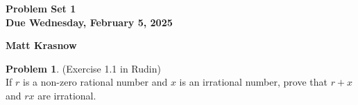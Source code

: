 \documentclass[12pt,oneside]{article}
\theoremstyle{definition}
\newtheorem{problem}{Problem}
\begin{document}
\pagestyle{fancy}

\begin{center}
\bf \Large
Problem Set 1 \\[0.5em]
\large
Due Wednesday, February 5, 2025
\end{center}
\begin{center}
\bf \Large
Matt Krasnow
\end{center}

\bigskip

\begin{problem}
(Exercise 1.1 in Rudin)\\
If \( r \) is a non-zero rational number and \( x \) is an irrational number, prove that \( r + x \) and \( r x \) are irrational.
\end{problem}
\end{document}
